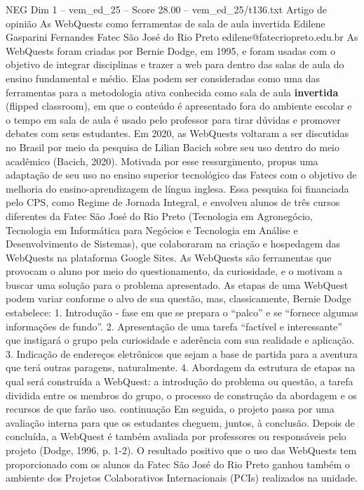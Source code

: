 \begin{textsample}{NEG Dim 1 – vem\_ed\_25 – Score 28.00 – vem\_ed\_25/t136.txt}  \label{ex:f1_neg_121}
Artigo de opinião As WebQuests como ferramentas de sala de aula invertida Edilene Gasparini Fernandes Fatec São José do Rio Preto edilene@fatecriopreto.edu.br As WebQuests foram criadas por Bernie Dodge, em 1995, e foram usadas com o objetivo de integrar disciplinas e trazer a web para dentro das salas de aula do ensino fundamental e médio.
Elas podem ser consideradas como uma das ferramentas para a metodologia ativa conhecida como sala de aula \textbf{invertida} (flipped classroom), em que o conteúdo é apresentado fora do ambiente escolar e o tempo em sala de aula é usado pelo professor para tirar dúvidas e promover debates com seus estudantes.
Em 2020, as WebQuests voltaram a ser discutidas no Brasil por meio da pesquisa de Lilian Bacich sobre seu uso dentro do meio acadêmico (Bacich, 2020).
Motivada por esse ressurgimento, propus uma adaptação de seu uso no ensino superior tecnológico das Fatecs com o objetivo de melhoria do ensino-aprendizagem de língua inglesa.
Essa pesquisa foi financiada pelo CPS, como Regime de Jornada Integral, e envolveu alunos de três cursos diferentes da Fatec São José do Rio Preto (Tecnologia em Agronegócio, Tecnologia em Informática para Negócios e Tecnologia em Análise e Desenvolvimento de Sistemas), que colaboraram na criação e hospedagem das WebQuests na plataforma Google Sites.
As WebQuests são ferramentas que provocam o aluno por meio do questionamento, da curiosidade, e o motivam a buscar uma solução para o problema apresentado.
As etapas de uma WebQuest podem variar conforme o alvo de sua questão, mas, classicamente, Bernie Dodge estabelece: 1.
Introdução - fase em que se prepara o “palco” e se “fornece algumas informações de fundo”. 2.
Apresentação de uma tarefa “factível e interessante” que instigará o grupo pela curiosidade e aderência com sua realidade e aplicação. 3.
Indicação de endereços eletrônicos que sejam a base de partida para a aventura que terá outras paragens, naturalmente. 4.
Abordagem da estrutura de etapas na qual será construída a WebQuest: a introdução do problema ou questão, a tarefa dividida entre os membros do grupo, o processo de construção da abordagem e os recursos de que farão uso. continuação Em seguida, o projeto passa por uma avaliação interna para que os estudantes cheguem, juntos, à conclusão.
Depois de concluída, a WebQuest é também avaliada por professores ou responsáveis pelo projeto (Dodge, 1996, p. 1-2).
O resultado positivo que o uso das WebQuests tem proporcionado com os alunos da Fatec São José do Rio Preto ganhou também o ambiente dos Projetos Colaborativos Internacionais (PCIs) realizados na unidade.

\end{textsample}
